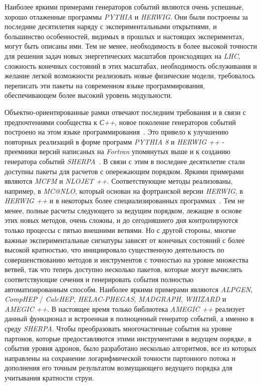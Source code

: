 Наиболее яркими примерами генераторов событий являются очень успешные, хорошо отлаженные программы
\textit{PYTHIA} и \textit{HERWIG}. Они были построены за последние десятилетия наряду с экспериментальными открытиями, и большинство особенностей, видимых в прошлых и настоящих экспериментах, могут быть описаны
ими. Тем не менее, необходимость в более высокой точности для решения задач новых энергетических масштабов происходящих
на \textit{LHC}, сложность конечных состояний в этих масштабах, необходимость обслуживания и желание легкой возможности реализовать новые физические модели, требовалось переписать эти пакеты на современном языке программирования, обеспечивающем более высокий уровень модульности.

Объектно-ориентированные рамки отвечают последним
требования и в связи с предпочтениями сообщества к \textit{С++}, новое поколение генераторов событий
построено на этом языке программирования~\cite{review-sherpa}. Это привело к улучшению повторных реализаций в форме
программ \textit{PYTHIA 8} и \textit{HERWIG ++} - преемники версий написаных на \textit{Fortran} упомянутых выше
и к созданию генератора событий \textit{SHERPA}~\cite{review-sherpa}.
В связи с этим в последнее десятилетие стали доступны пакеты для расчетов с опережающим порядком. Яркими примерами являются \textit{MCFM} и \textit{NLOJET ++}. Соответствующие методы реализованы, например, в \textit{MC@NLO}, который основан
на фортранской версии \textit{HERWIG}, в \textit{HERWIG ++} и в некоторых более специализированных программах~\cite{review-sherpa}.
Тем не менее, полные расчеты следующего за ведущим порядком, лежащие в основе этих новых методов, очень сложны, и до сегодняшнего дня контролируются только процессы с пятью внешними ветвями. Но
с другой стороны, многие важные экспериментальные сигнатуры зависят от конечных состояний с более высокой кратностью, что
инициировало существенную деятельность по совершенствованию методов и инструментов с точностью на уровне множества ветвей, так что
теперь доступно несколько пакетов, которые могут вычислять соответствующие сечения и генерировать события
полностью автоматизированным способм. Наиболее яркими примерами являются \textit{ALPGEN}, \textit{CompHEP} / \textit{CalcHEP},
\textit{HELAC-PHEGAS}, \textit{MADGRAPH}, \textit{WHIZARD} и \textit{AMEGIC ++}. В настоящее время только библиотека \textit{AMEGIC ++} реализует данный функционал и встроенная в полноценный генератор событий, а именно в среду \textit{SHERPA}. Чтобы
преобразовать многочастичные события на уровне партонов, которые предоставляются этими инструментами в ведущем порядке, в
события уровня адронов, было разработано несколько алгоритмов, все из которых направлены на сохранение логарифмической
точности партонного потока и дополнения его точным результатом возмущающего ведущего порядка для
учитывания кратности струи.

